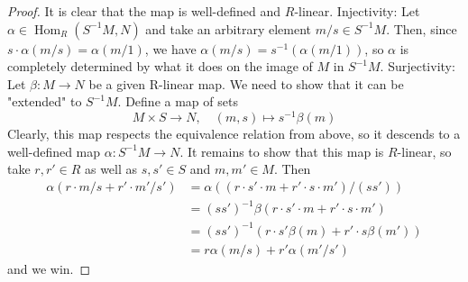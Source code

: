 \documentclass[10pt,a4paper]{amsart}
\theoremstyle{plain}
\theoremstyle{definition}
\theoremstyle{remark}
\numberwithin{equation}{subsection}
\def\Hom{\mathop{\mathrm{Hom}}\nolimits}
\begin{document}
\begin{proof}
It is clear that the map is well-defined and $R$-linear.
Injectivity: Let $\alpha \in \Hom_R(S^{-1}M, N)$ and take an arbitrary
element $m/s \in S^{-1}M$. Then, since $s \cdot \alpha(m/s) = \alpha(m/1)$,
we have $ \alpha(m/s) =s^{-1}(\alpha (m/1))$, so $\alpha$ is completely
determined by what it does on the image of $M$ in $S^{-1}M$.
Surjectivity: Let $\beta : M \rightarrow N$ be a given R-linear map.
We need to show that it can be "extended" to $S^{-1}M$. Define a map of
sets
$$
M \times S \rightarrow N,\quad
(m,s) \mapsto s^{-1}\beta(m)
$$
Clearly, this map respects the equivalence relation from above, so it
descends to a well-defined map $\alpha : S^{-1}M \rightarrow N$.
It remains to show that this map is $R$-linear, so take
$r, r' \in R$ as well as $s, s' \in S$ and
$m, m' \in M$. Then
\begin{align*}
\alpha(r \cdot m/s + r' \cdot m' /s')
& =
\alpha((r \cdot s' \cdot m + r' \cdot s \cdot m') /(ss')) \\
& =
(ss')^{-1}\beta(r \cdot s' \cdot m + r' \cdot s \cdot m') \\
& =
(ss')^{-1} (r \cdot s' \beta (m) + r' \cdot s \beta (m')) \\
& =
r \alpha (m/s) + r' \alpha (m' /s')
\end{align*}
and we win.
\end{proof}
\end{document}
